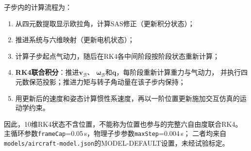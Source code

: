 子步内的计算流程为：
\begin{enumerate}[label=(\arabic*)]
    \item 从四元数提取显示欧拉角，计算SAS修正（更新积分状态）；
    \item 推进系统与六维映射（更新电机状态）；
    \item 计算子步起点气动力，随后在RK4各中间阶段按阶段状态重新计算；
    \item \textbf{RK4联合积分}：推进$\mathbf{v}_{\mathcal{B}}$、
          $\boldsymbol{\omega}_{\mathcal{B}}$和$\mathbf{q}$，每阶段重新计算重力与气动力，
          并执行四元数保范投影；推进力矩与转子角动量在该子步内保持；
    \item 用更新后的速度和姿态计算惯性系速度，再以一阶位置更新施加交互仿真的运动学约束。
\end{enumerate}

因此，10维RK4状态不含位置，不能称为位置也参与的完整六自由度联合RK4。
主循环参数\texttt{frameCap}=0.05\,s，物理子步参数\texttt{maxStep}=0.004\,s；
二者均来自\texttt{models/aircraft-model.json}的MODEL-DEFAULT设置，未经试验标定。
